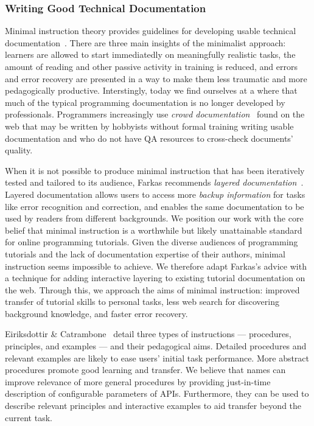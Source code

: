 \subsubsection{Writing Good Technical Documentation}

Minimal instruction theory provides guidelines for developing usable technical documentation~\cite{carroll_nurnberg_1990}.
There are three main insights of the minimalist approach:
learners are allowed to start immediatedly on meaningfully realistic tasks,
the amount of reading and other passive activity in training is reduced,
and errors and error recovery are presented in a way to make them less traumatic and more pedagogically productive.
Interstingly, today we find ourselves at a where that much of the typical programming documentation is no longer developed by professionals.
Programmers increasingly use \emph{crowd documentation}~\cite{parnin_measuring_2011} found on the web that may be written by hobbyists without formal training writing usable documentation and who do not have QA resources to cross-check documents' quality.

When it is not possible to produce minimal instruction that has been iteratively tested and tailored to its audience, Farkas recommends \emph{layered documentation}~\cite{farkas_layering_1998}.
Layered documentation allows users to access more \emph{backup information} for tasks like error recognition and correction, and enables the same documentation to be used by readers from different backgrounds.
We position our work with the core belief that minimal instruction is a worthwhile but likely unattainable standard for online programming tutorials.
Given the diverse audiences of programming tutorials and the lack of documentation expertise of their authors, minimal instruction seems impossible to achieve.
We therefore adapt Farkas's advice with a technique for adding interactive layering to existing tutorial documentation on the web.
Through this, we approach the aims of minimal instruction: improved transfer of tutorial skills to personal tasks, less web search for discovering background knowledge, and faster error recovery.

Eiriksdottir \& Catrambone~\cite{eiriksdottir_procedural_2011} detail three types of instructions --- procedures, principles, and examples --- and their pedagogical aims.
Detailed procedures and relevant examples are likely to ease users' initial task performance.
More abstract procedures promote good learning and transfer.
We believe that \glspl{name} can improve relevance of more general procedures by providing just-in-time description of configurable parameters of APIs.
Furthermore, they can be used to describe relevant principles and interactive examples to aid transfer beyond the current task.

